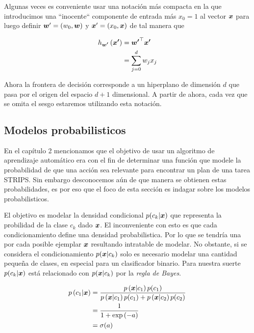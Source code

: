Algunas veces es conveniente usar una notación más compacta en la que
introducimos una ``inocente`` componente de entrada más $x_0 = 1$ al vector
$\boldsymbol{x}$ para luego definir $\boldsymbol{w}' = (w_0, \boldsymbol{w})$ y $\boldsymbol{x}' = (x_0,
\boldsymbol{x})$ de tal manera que 

\begin{align*}
    h_{\boldsymbol{w'}}\left( \boldsymbol{x'} \right) &= \boldsymbol{w'}^{\top} \boldsymbol{x'}\\
                                           &= \sum_{j = 0 }^{d} w_j x_j
\end{align*}

Ahora la frontera de decisión corresponde a un hiperplano de dimensión $d$ que
pasa por el origen del espacio $d + 1$ dimensional. A partir de ahora, cada vez
que se omita el sesgo estaremos utilizando esta notación.

\subsection{Modelos probabilisticos}

En el capítulo 2 mencionamos que el objetivo de usar un algoritmo de aprendizaje
automático era con el fin de determinar una función que modele la probabilidad
de que una acción sea relevante para encontrar un plan de una tarea STRIPS. Sin
embargo desconocemos aún de que manera se obtienen estas probabilidades, es por
eso que el foco de esta sección es indagar sobre los modelos probabilisticos.

El objetivo es modelar la densidad condicional $p(c_k | \boldsymbol{x})$ que
representa la probilidad de la clase $c_k$ dado $\boldsymbol{x}$. El inconveniente con
esto es que cada condicionamiento define una densidad probabilistica. Por lo que
se tendría una por cada posible ejemplar $\boldsymbol{x}$ resultando intratable de
modelar. No obstante, si se considera el condicionamiento $p(\boldsymbol{x} | c_k)$
solo es necesario modelar una cantidad pequeña de clases, en especial para un
clasificador binario. Para nuestra suerte $p(c_k | \boldsymbol{x})$ está relacionado
con $p(\boldsymbol{x} | c_k)$ por la \emph{regla de Bayes}.

\begin{align*}
    p\left( c_1 | \boldsymbol{x} \right) &= \frac{p\left( \boldsymbol{x} | c_1 \right)p(c_1)}{
                                            p\left( \boldsymbol{x} | c_1 \right) p(c_1) + 
                                            p\left( \boldsymbol{x} | c_2 \right)p(c_2)} \\
                                   &= \frac{1}{1 + \exp\left( -a \right)} \\
                                   &= \sigma(a)
\end{align*}

